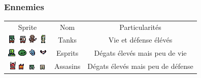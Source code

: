 \documentclass[a4paper, 12pt]{article}
\begin{document}
\subsubsection*{Ennemies}
\begin{center}
\begin{tabular}{ | c | c | c | }
	\hline
    Sprite & Nom & Particularités\\
    \includegraphics[scale=2]{./monsters/Orc} \includegraphics[scale=2]{./monsters/Mask}
    \includegraphics[scale=1.5]{./monsters/SkeletonKnife} \includegraphics[scale=2]{./monsters/Zombie} & Tanks & Vie et défense élévés\\
    
    \hline
    \includegraphics[scale=2]{./monsters/Swamp} 
    \includegraphics[scale=1.4]{./monsters/Slime}
    \includegraphics[scale=1.9]{./monsters/Spirit}
    \includegraphics[scale=1.7]{./monsters/Bat} & Esprits & Dégats élevés mais peu de vie\\
   
    \hline
    \includegraphics[scale=2]{./monsters/Demon}\includegraphics[scale=2]{./monsters/Imp}
    \includegraphics[scale=2]{./monsters/LilGob}
    \includegraphics[scale=2]{./monsters/LilZombie} & Assasins & Dégats élevés mais peu de défense\\
    

\end{tabular}
\end{center}
\end{document}
